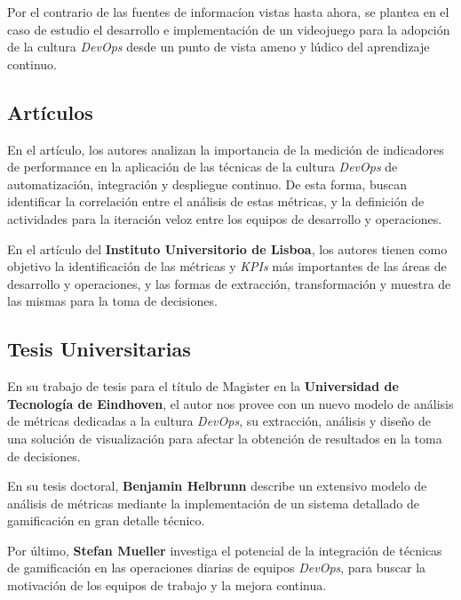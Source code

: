 \documentclass[journal]{IEEEtran}
\begin{document}
\cite{grande2023serious} Por el contrario de las fuentes de informacíon vistas hasta ahora, se plantea en el caso de estudio el desarrollo e implementación de un videojuego para la adopción de la cultura \textit{DevOps} desde un punto de vista ameno y lúdico del aprendizaje continuo.

\subsection{\textbf{ \textbf{\large Artículos}}}

\cite{brunnert2015performance} En el artículo, los autores analizan la importancia de la medición de indicadores de performance en la aplicación de las técnicas de la cultura \textit{DevOps} de automatización, integración y despliegue continuo. De esta forma, buscan identificar la correlación entre el análisis de estas métricas, y la definición de actividades para la iteración veloz entre los equipos de desarrollo y operaciones.

\cite{amaro2024devops} En el artículo del \textbf{Instituto Universitorio de Lisboa}, los autores tienen como objetivo la identificación de las métricas y \textit{KPIs} más importantes de las áreas de desarrollo y operaciones, y las formas de extracción, transformación y muestra de las mismas para la toma de decisiones.

\subsection{\textbf{ \textbf{\large Tesis Universitarias}}}

\cite{kruis2014designing} En su trabajo de tesis para el título de Magister en la \textbf{Universidad de Tecnología de Eindhoven}, el autor nos provee con un nuevo modelo de análisis de métricas dedicadas a la cultura \textit{DevOps}, su extracción, análisis y diseño de una solución de visualización para afectar la obtención de resultados en la toma de decisiones.

\cite{heilbrunn2014towards} En su tesis doctoral, \textbf{Benjamin Helbrunn} describe un extensivo modelo de análisis de métricas mediante la implementación de un sistema detallado de gamificación en gran detalle técnico.

\cite{mueller2024leveraging} Por último, \textbf{Stefan Mueller} investiga el potencial de la integración de técnicas de gamificación en las operaciones diarias de equipos \textit{DevOps}, para buscar la motivación de los equipos de trabajo y la mejora continua.



\end{document}
